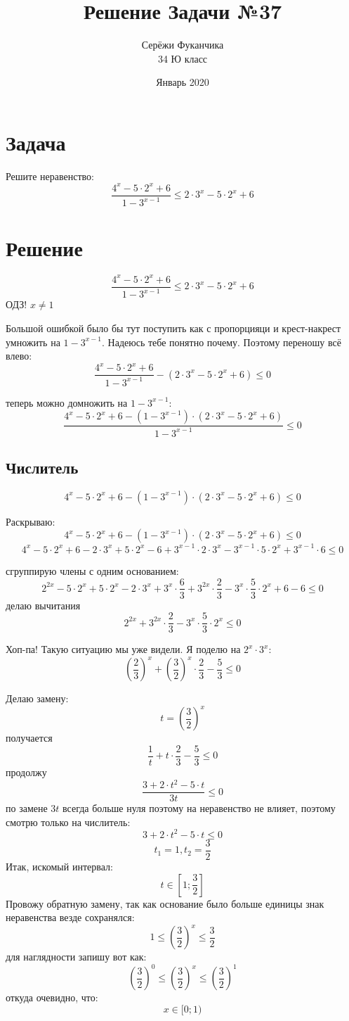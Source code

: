 \documentclass{article}
\title{Решение Задачи №37}
\author{Серёжи Фуканчика\\34 Ю класс}
\date{Январь 2020}
\begin{document}
\maketitle

\section{Задача}
Решите неравенство:
$$\frac{4^x-5\cdot{}2^x+6}{1-3^{x-1}}\leq{}2\cdot{}3^x-5\cdot{}2^x+6$$

\section{Решение}
$$\frac{4^x-5\cdot{}2^x+6}{1-3^{x-1}}\leq{}2\cdot{}3^x-5\cdot{}2^x+6$$
ОДЗ! $x\ne{}1$

Большой ошибкой было бы тут поступить как с пропорцияци и крест-накрест умножить на $1-3^{x-1}$. Надеюсь тебе понятно почему. Поэтому переношу всё влево:
$$\frac{4^x-5\cdot{}2^x+6}{1-3^{x-1}}-(2\cdot{}3^x-5\cdot{}2^x+6)\leq{}0$$

теперь можно домножить на $1-3^{x-1}$:
$$\frac{4^x-5\cdot{}2^x+6-(1-3^{x-1})\cdot{}(2\cdot{}3^x-5\cdot{}2^x+6)}{1-3^{x-1}}\leq{}0$$

\subsection{Числитель}
$$4^x-5\cdot{}2^x+6-(1-3^{x-1})\cdot{}(2\cdot{}3^x-5\cdot{}2^x+6)\leq{}0$$

Раскрываю:
$$4^x-5\cdot{}2^x+6-(1-3^{x-1})\cdot{}(2\cdot{}3^x-5\cdot{}2^x+6)\leq{}0$$
$$4^x-5\cdot{}2^x+6-2\cdot{}3^x+5\cdot{}2^x-6+3^{x-1}\cdot{}2\cdot{}3^x-3^{x-1}\cdot{}5\cdot{}2^x+3^{x-1}\cdot{}6\leq{}0$$

сгруппирую члены с одним основанием:
$$2^{2x}-5\cdot{}2^x+5\cdot{}2^x-2\cdot{}3^x+3^{x}\cdot{}\frac{6}{3}+3^{2x}\cdot{}\frac{2}{3}-3^{x}\cdot{}\frac{5}{3}\cdot{}2^x+6-6\leq{}0$$
делаю вычитания
$$2^{2x}+3^{2x}\cdot{}\frac{2}{3}-3^{x}\cdot{}\frac{5}{3}\cdot{}2^x\leq{}0$$

Хоп-па! Такую ситуацию мы уже видели. Я поделю на $2^x\cdot{}3^x$:
$$\left(\frac{2}{3}\right)^{x}+\left(\frac{3}{2}\right)^{x}\cdot{}\frac{2}{3}-\frac{5}{3}\leq{}0$$

Делаю замену:
$$t=\left(\frac{3}{2}\right)^x$$
получается
$$\frac{1}{t}+t\cdot{}\frac{2}{3}-\frac{5}{3}\leq{}0$$
продолжу
$$\frac{3+2\cdot{}t^2-5\cdot{}t}{3t}\leq{}0$$
по замене $3t$ всегда больше нуля поэтому на неравенство не влияет, поэтому смотрю только на числитель:
$$3+2\cdot{}t^2-5\cdot{}t\leq{}0$$
$$t_1=1, t_2=\frac{3}{2}$$
Итак, искомый интервал:
$$t\in{}[1;\frac{3}{2}]$$
Провожу обратную замену, так как основание было больше единицы знак неравенства везде сохранялся:
$$1\leq{}\left(\frac{3}{2}\right)^x\leq{}\frac{3}{2}$$
для наглядности запишу вот как:
$$\left(\frac{3}{2}\right)^0\leq{}\left(\frac{3}{2}\right)^x\leq{}\left(\frac{3}{2}\right)^1$$
откуда очевидно, что:
$$x\in{[0;1)}$$
\end{document}

